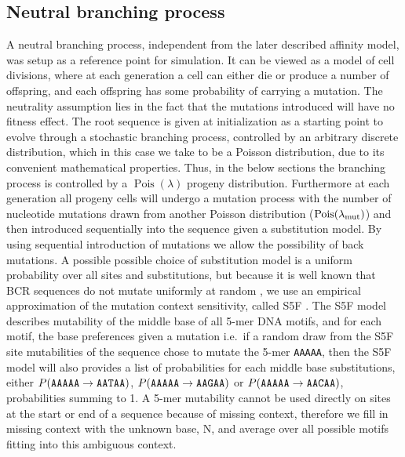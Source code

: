 \subsection{Neutral branching process}
A neutral branching process, independent from the later described affinity model, was setup as a reference point for simulation.
It can be viewed as a model of cell divisions, where at each generation a cell can either die or produce a number of offspring, and each offspring has some probability of carrying a mutation.
The neutrality assumption lies in the fact that the mutations introduced will have no fitness effect.
The root sequence is given at initialization as a starting point to evolve through a stochastic branching process, controlled by an arbitrary discrete distribution, which in this case we take to be a Poisson distribution, due to its convenient mathematical properties.
Thus, in the below sections the branching process is controlled by a $\operatorname{Pois}(\lambda)$ progeny distribution.
Furthermore at each generation all progeny cells will undergo a mutation process with the number of nucleotide mutations drawn from another Poisson distribution ($\operatorname{Pois}(\lambda_{\text{mut}})$) and then introduced sequentially into the sequence given a substitution model.
By using sequential introduction of mutations we allow the possibility of back mutations.
A possible possible choice of substitution model is a uniform probability over all sites and substitutions, but because it is well known that BCR sequences do not mutate uniformly at random \cite{Yeap2015-nl}, we use an empirical approximation of the mutation context sensitivity, called S5F \cite{cui2016model}.
The S5F model describes mutability of the middle base of all 5-mer DNA motifs, and for each motif, the base preferences given a mutation i.e.\ if a random draw from the S5F site mutabilities of the sequence chose to mutate the 5-mer \texttt{AAAAA}, then the S5F model will also provides a list of probabilities for each middle base substitutions, either $P(\text{\texttt{AAAAA}} \rightarrow \text{\texttt{AATAA}})$, $P(\text{\texttt{AAAAA}} \rightarrow \text{\texttt{AAGAA}})$ or $P(\text{\texttt{AAAAA}} \rightarrow \text{\texttt{AACAA}})$, probabilities summing to 1.
A 5-mer mutability cannot be used directly on sites at the start or end of a sequence because of missing context, therefore we fill in missing context with the unknown base, N, and average over all possible motifs fitting into this ambiguous context.

